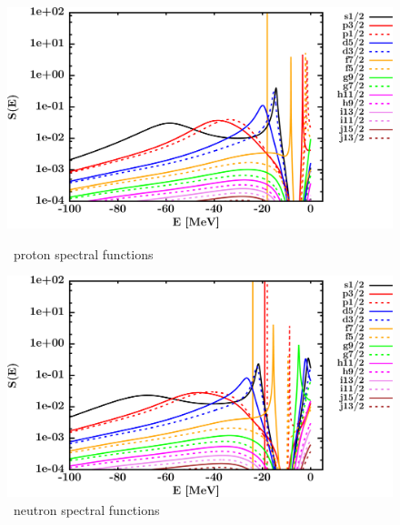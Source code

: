 \begin{figure}[hbtp]
    \centering
    \begin{minipage}{0.42\textwidth}
        \centering
        \includegraphics[width=\textwidth]{figures/ni58_protonSpectralFunctions.png}
        \caption*{\niEight\ proton spectral functions}
        \label{DOMFitData_ni58_proton_spectralFunctions}
    \end{minipage}\hspace{6pt}
    \begin{minipage}{0.42\textwidth}
        \centering
        \includegraphics[width=\linewidth]{figures/ni58_neutronSpectralFunctions.png}
        \caption*{\niEight\ neutron spectral functions}
        \label{DOMFitData_ni58_neutron_spectralFunctions}
    \end{minipage}
\end{figure}
